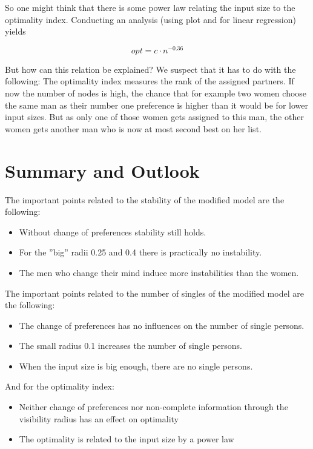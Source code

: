 \documentclass[11pt]{article}
\begin{document}
So one might think that there is some power law relating the input size to the optimality index. Conducting an analysis (using 
plot and  for linear regression) yields

$$opt = c \cdot n^{-0.36}$$

But how can this relation be explained? We suspect that it has to do with the following: The optimality index measures the rank of the
assigned partners. If now the number of nodes is high, the chance that for example two women choose the same man as their number one preference
is higher than it would be for lower input sizes. But as only one of those women gets assigned to this man, the other women gets another man who
is now at most second best on her list.

\newpage
\section{Summary and Outlook}

The important points related to the stability of the modified model are the following:
\begin{itemize}
  \item Without change of preferences stability still holds.
  \item For the ''big'' radii 0.25 and 0.4 there is practically no instability.
  \item The men who change their mind induce more instabilities than the women.
\end{itemize}
The important points related to the number of singles of the modified model are the following:
\begin{itemize}
  \item The change of preferences has no influences on the number of single persons.
  \item The small radius 0.1 increases the number of single persons.
  \item When the input size is big enough, there are no single persons.
\end{itemize}
And for the optimality index:
\begin{itemize}
  \item Neither change of preferences nor non-complete information through the visibility radius has an effect on optimality
  \item The optimality is related to the input size by a power law
\end{itemize}

\nocite{yt1}
\nocite{yt2}
\end{document}
